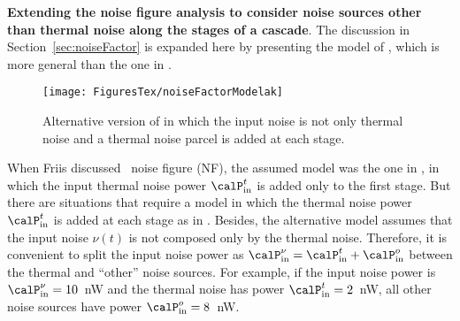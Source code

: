 
\bApplication \textbf{Extending the noise figure analysis to consider noise sources other
than thermal noise along the stages of a cascade}.
\label{app:extendedNoiseFactor}
The discussion in Section~\ref{sec:noiseFactor} is expanded here by presenting
the model of 
, which is more general than 
the one in .

\begin{figure}[htbp]
	\centering
		\texttt{[image: FiguresTex/noiseFactorModelak]}		
	\caption{Alternative version of  in which the input noise is not only thermal noise and a thermal noise parcel is added at each stage.\label{fig:noiseFactorModelak}}
\end{figure}

When Friis discussed~\cite{Friis44} noise figure (NF), the assumed model was the one in , in which 
the input thermal noise power $\calP_{\textrm{in}}^{t}$ is added only to the first stage.
But there are situations that require a model in which the thermal noise
power $\calP_{\textrm{in}}^{t}$ is added at each stage as in .
Besides, the alternative model assumes that the input noise $\nu(t)$ is not composed only by the thermal noise. 
Therefore, it is convenient to split the input noise power as $\calP_{\textrm{in}}^{\nu} = \calP_{\textrm{in}}^{t} + \calP_{\textrm{in}}^{o}$ between the thermal and ``other'' noise sources. For example, if the input noise power is $\calP_{\textrm{in}}^{\nu}=10$~nW and the thermal noise has power $\calP_{\textrm{in}}^{t}=2$~nW, all other noise sources have power $\calP_{\textrm{in}}^{o}=8$~nW.

